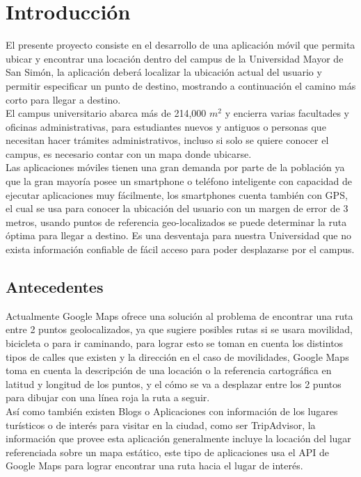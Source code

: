 \chapter{Introducción} %
\label{cha:introduccion}

El presente proyecto consiste en el desarrollo de una aplicación móvil que permita ubicar y encontrar una locación dentro del campus de la Universidad Mayor de San Simón, la aplicación deberá localizar la ubicación actual del usuario y permitir especificar un punto de destino, mostrando a continuación el camino más corto para llegar a destino.\\

El campus universitario abarca más de 214,000 $m^2$ y encierra varias facultades y oficinas administrativas, para estudiantes nuevos y antiguos o personas que
necesitan hacer trámites administrativos, incluso si solo se quiere conocer el
campus, es necesario contar con un mapa donde ubicarse.\\

Las aplicaciones móviles tienen una gran demanda por parte de la población ya
que la gran mayoría posee un smartphone o teléfono inteligente con capacidad de
ejecutar aplicaciones muy fácilmente, los smartphones cuenta también con GPS,
el cual se usa para conocer la ubicación del usuario con un margen de error de
3 metros, usando puntos de referencia geo-localizados se puede determinar la
ruta óptima para llegar a destino. Es una desventaja para nuestra Universidad que no exista información confiable de fácil acceso para poder desplazarse por el campus.\\

  \section{Antecedentes} %
  \label{sec:antecedentes}
  Actualmente Google Maps ofrece una solución al problema de encontrar una ruta entre 2 puntos geolocalizados, ya que sugiere posibles rutas si se usara movilidad, bicicleta o para ir caminando, para lograr esto se toman en cuenta los distintos tipos de calles que existen y la dirección en el caso de movilidades, Google Maps toma en cuenta la descripción de una locación o la referencia cartográfica en latitud y longitud de los puntos, y el cómo se va a desplazar entre los 2 puntos para dibujar con una línea roja la ruta a seguir.\\


  Así como también existen Blogs o Aplicaciones con información de los lugares turísticos o de interés para visitar en la ciudad, como ser TripAdvisor, la información que provee esta aplicación generalmente incluye la locación del lugar referenciada sobre un mapa estático, este tipo de aplicaciones usa el API de Google Maps para lograr encontrar una ruta hacia el lugar de interés.\\



